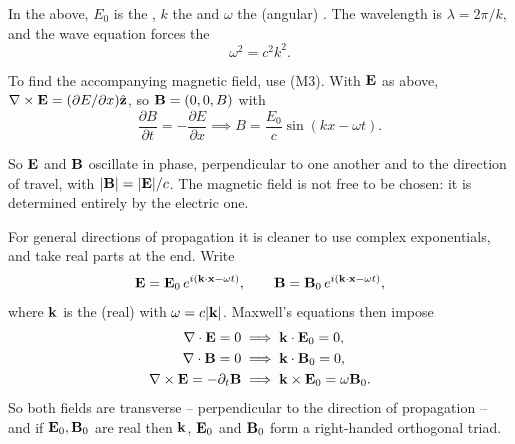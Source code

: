 \documentclass[a4paper]{scrartcl}
\newcommand{\hh}[1]{\hat{\vv{#1}}}
\begin{document}
\begin{definition}
	In the above, $E_0$ is the , $k$ the  and $\omega$ the (angular) . The wavelength is $\lambda = 2\pi/k$, and the wave equation forces the 
	$$
	\omega^2 = c^2 k^2.
	$$
\end{definition}

To find the accompanying magnetic field, use (M3). With $\mathbf{E}$ as above, $\nabla\times\vv{E} = (\partial E/\partial x)\hh{z}$, so $\mathbf{B} = (0,0,B)$ with
$$
\frac{\partial B}{\partial t} = -\frac{\partial E}{\partial x} \implies B = \frac{E_0}{c}\sin(kx-\omega t).
$$

\begin{center}
\end{center}

So $\mathbf{E}$ and $\mathbf{B}$ oscillate in phase, perpendicular to one another and to the direction of travel, with $|\mathbf{B}| = |\mathbf{E}|/c$. The magnetic field is not free to be chosen: it is determined entirely by the electric one.

For general directions of propagation it is cleaner to use complex exponentials, and take real parts at the end. Write
$$
\mathbf{E} = \mathbf{E}_0\, e^{i(\mathbf{k}\cdot\mathbf{x} - \omega t)}, \qquad \mathbf{B} = \mathbf{B}_0\, e^{i(\mathbf{k}\cdot\mathbf{x}-\omega t)},
$$
where $\mathbf{k}$ is the (real)  with $\omega = c|\mathbf{k}|$. Maxwell's equations then impose
\begin{align*}
	\nabla\cdot\mathbf{E} = 0 &\implies \mathbf{k}\cdot\mathbf{E}_0 = 0,\\
	\nabla\cdot\mathbf{B} = 0 &\implies \mathbf{k}\cdot\mathbf{B}_0 = 0,\\
	\nabla\times\mathbf{E} = -\partial_t\mathbf{B} &\implies \mathbf{k}\times\mathbf{E}_0 = \omega \mathbf{B}_0.
\end{align*}
So both fields are transverse -- perpendicular to the direction of propagation -- and if $\mathbf{E}_0, \mathbf{B}_0$ are real then $\mathbf{k}$, $\mathbf{E}_0$ and $\mathbf{B}_0$ form a right-handed orthogonal triad.
\end{document}
